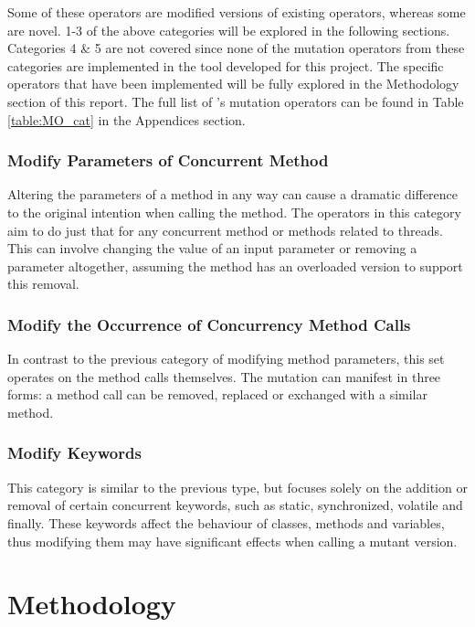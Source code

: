 \documentclass[a4paper,12pt]{article}
\begin{document}
Some of these operators are modified versions of existing operators, whereas some are novel. 1-3 of the above categories will be explored in the following sections. Categories 4 \& 5 are not covered since none of the mutation operators from these categories are implemented in the tool developed for this project. The specific operators that have been implemented will be fully explored in the Methodology section of this report. The full list of \citet{bradbury06}'s mutation operators can be found in Table \ref{table:MO_cat} in the Appendices section.


\subsubsection{Modify Parameters of Concurrent Method} \label{section:Modify Parameters}

Altering the parameters of a method in any way can cause a dramatic difference to the original intention when calling the method. The operators in this category aim to do just that for any concurrent method or methods related to threads. This can involve changing the value of an input parameter or removing a parameter altogether, assuming the method has an overloaded version to support this removal.  


\subsubsection{Modify the Occurrence of Concurrency Method Calls} \label{section:Modify Method Calls}

In contrast to the previous category of modifying method parameters, this set operates on the method calls themselves. The mutation can manifest in three forms: a method call can be removed, replaced or exchanged with a similar method.   


\subsubsection{Modify Keywords} \label{section:Modify Keywords}

This category is similar to the previous type, but focuses solely on the addition or removal of certain concurrent keywords, such as static, synchronized, volatile and finally. These keywords affect the behaviour of classes, methods and variables, thus modifying them may have significant effects when calling a mutant version.


\newpage
\section{Methodology}
\end{document}
